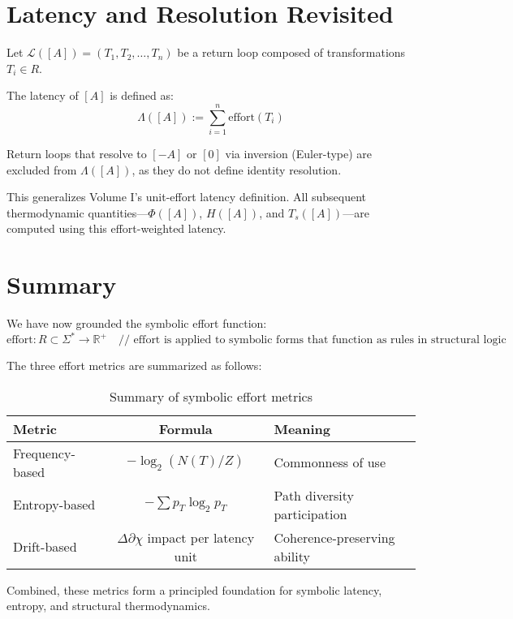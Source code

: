\section{Latency and Resolution Revisited} \label{latency-and-resolution-revisited}

Let $\mathcal{L}([A]) = (T_1, T_2, \dots, T_n)$ be a return loop composed of transformations $T_i \in R$.

\begin{definition}
The latency of $[A]$ is defined as:
\begin{equation} \label{eq:latency-effort}
\Lambda([A]) := \sum_{i=1}^n \text{effort}(T_i)
\end{equation}
\end{definition}

Return loops that resolve to $[-A]$ or $[0]$ via inversion (Euler-type) are excluded from $\Lambda([A])$, as they do not define identity resolution.

\medskip

This generalizes Volume I’s unit-effort latency definition. All subsequent thermodynamic quantities—$\Phi([A])$, $H([A])$, and $T_s([A])$—are computed using this effort-weighted latency.

\section{Summary} \label{summary}

We have now grounded the symbolic effort function:
\[
\text{effort}: R \subset \Sigma^* \to \mathbb{R}^+ \quad \text{// effort is applied to symbolic forms that function as rules in structural logic}
\]

The three effort metrics are summarized as follows:

\begin{table}[h!]
\centering
\begin{tabular}{|l|c|l|}
\hline
\textbf{Metric} & \textbf{Formula} & \textbf{Meaning} \\
\hline
Frequency-based & $-\log_2(N(T)/Z)$ & Commonness of use \\
Entropy-based   & $-\sum p_T \log_2 p_T$ & Path diversity participation \\
Drift-based     & $\Delta\partial\chi$ impact per latency unit & Coherence-preserving ability \\
\hline
\end{tabular}
\caption{Summary of symbolic effort metrics}
\end{table}

\medskip

Combined, these metrics form a principled foundation for symbolic latency, entropy, and structural thermodynamics.
